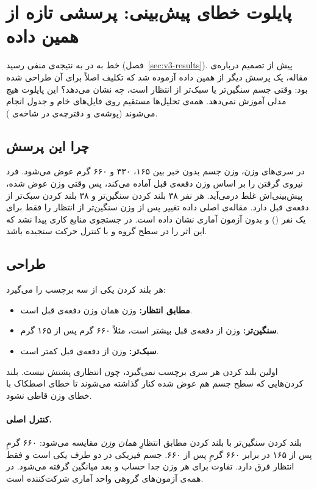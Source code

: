 \section{پایلوت خطای پیش‌بینی: پرسشی تازه از همین داده}
\label{sec:pe-pilot}

خط  به  در  به نتیجه‌ی منفی رسید (فصل~\ref{sec:v3-results}). پیش از تصمیم درباره‌ی مقاله، یک پرسش دیگر از همین داده آزموده شد که تکلیف اصلاً برای آن طراحی شده بود: وقتی جسم سنگین‌تر یا سبک‌تر از انتظار است،  چه نشان می‌دهد؟ این پایلوت هیچ مدلی آموزش نمی‌دهد. همه‌ی تحلیل‌ها مستقیم روی فایل‌های خام  و جدول  انجام می‌شوند (پوشه‌ی  و دفترچه‌ی  در شاخه‌ی ).

\subsection{چرا این پرسش}

در سری‌های وزن، وزن جسم بدون خبر بین ۱۶۵، ۳۳۰ و ۶۶۰ گرم عوض می‌شود. فرد نیروی گرفتن را بر اساس وزن دفعه‌ی قبل آماده می‌کند، پس وقتی وزن عوض شده، پیش‌بینی‌اش غلط درمی‌آید. هر نفر ۳۸ بلند کردن سنگین‌تر و ۳۸ بلند کردن سبک‌تر از دفعه‌ی قبل دارد. مقاله‌ی اصلی داده تغییر  پس از وزن سنگین‌تر از انتظار را فقط برای یک نفر () و بدون آزمون آماری نشان داده است. در جستجوی منابع کاری پیدا نشد که این اثر را در سطح گروه و با کنترل حرکت سنجیده باشد.

\subsection{طراحی}

هر بلند کردن یکی از سه برچسب را می‌گیرد:
\begin{itemize}
\item \textbf{مطابق انتظار:} وزن همان وزن دفعه‌ی قبل است.
\item \textbf{سنگین‌تر:} وزن از دفعه‌ی قبل بیشتر است، مثلاً ۶۶۰ گرم پس از ۱۶۵ گرم.
\item \textbf{سبک‌تر:} وزن از دفعه‌ی قبل کمتر است.
\end{itemize}
اولین بلند کردن هر سری برچسب نمی‌گیرد، چون انتظاری پشتش نیست. بلند کردن‌هایی که سطح جسم هم عوض شده کنار گذاشته می‌شوند تا خطای اصطکاک با خطای وزن قاطی نشود.

\paragraph{کنترل اصلی.} بلند کردن سنگین‌تر با بلند کردن مطابق انتظارِ \emph{همان وزن} مقایسه می‌شود: ۶۶۰ گرمِ پس از ۱۶۵ در برابر ۶۶۰ گرمِ پس از ۶۶۰. جسم فیزیکی در دو طرف یکی است و فقط انتظار فرق دارد. تفاوت برای هر وزن جدا حساب و بعد میانگین گرفته می‌شود. در همه‌ی آزمون‌های گروهی واحد آماری شرکت‌کننده است.

